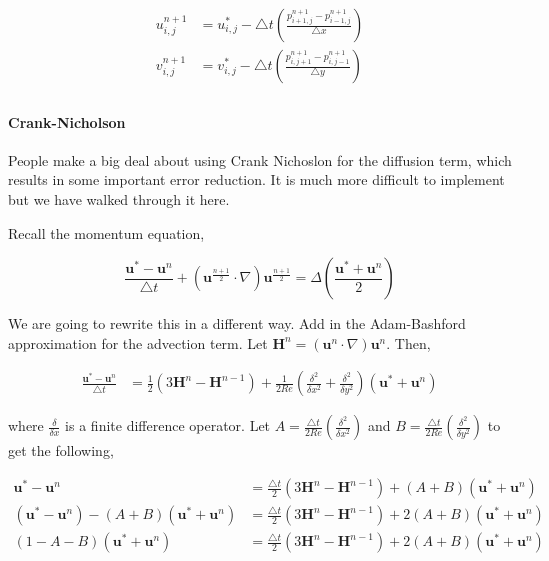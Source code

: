 \documentclass[12pt]{article}
\begin{document}
\begin{align*}
    u^{n+1}_{i,j} &= u^*_{i,j} - \bigtriangleup t (\frac{p^{n+1}_{i+1,j} - p^{n+1}_{i-1,j}}{\bigtriangleup x}) \\
    v^{n+1}_{i,j} &= v^*_{i,j} - \bigtriangleup t (\frac{p^{n+1}_{i,j+1} - p^{n+1}_{i,j-1}}{\bigtriangleup y}) \\
\end{align*}

\paragraph{Crank-Nicholson}
People make a big deal about using Crank Nichoslon for the diffusion term, which results in some important error reduction. It is much more difficult to implement but we have walked through it here.

Recall the momentum equation,

\begin{equation}
    \frac{\mathbf{u}^* - \mathbf{u}^n}{\bigtriangleup t} + (\mathbf{u}^{\frac{n+1}{2}} \cdot \nabla) \mathbf{u}^{\frac{n+1}{2}} = \Delta (\frac{\mathbf{u}^* + \mathbf{u}^n}{2})
\end{equation}

We are going to rewrite this in a different way. Add in the Adam-Bashford approximation for the advection term. Let $\mathbf{H}^n = (\mathbf{u}^{n} \cdot \nabla) \mathbf{u}^{n}$. Then,

\begin{align*}
    \frac{\mathbf{u}^* - \mathbf{u}^n}{\bigtriangleup t} &= \frac{1}{2}(3\mathbf{H}^n - \mathbf{H}^{n-1}) + \frac{1}{2Re}(\frac{\delta^2}{\delta x^2} + \frac{\delta^2}{\delta y^2})(\mathbf{u}^* + \mathbf{u}^n)
\end{align*}

where $\frac{\delta}{\delta x}$ is a finite difference operator. Let $A = \frac{\bigtriangleup t}{2 Re}(\frac{\delta^2}{\delta x^2})$ and $B = \frac{\bigtriangleup t}{2 Re}(\frac{\delta^2}{\delta y^2})$ to get the following,

\begin{align*}
\mathbf{u}^* - \mathbf{u}^n &= \frac{\bigtriangleup t}{2}(3\mathbf{H}^n - \mathbf{H}^{n-1}) + (A + B)(\mathbf{u}^* + \mathbf{u}^n) \\
(\mathbf{u}^* - \mathbf{u}^n) - (A + B)(\mathbf{u}^* + \mathbf{u}^n) &= \frac{\bigtriangleup t}{2}(3\mathbf{H}^n - \mathbf{H}^{n-1}) + 2(A + B)(\mathbf{u}^* + \mathbf{u}^n) \\
(1 - A - B)(\mathbf{u}^* + \mathbf{u}^n) &= \frac{\bigtriangleup t}{2}(3\mathbf{H}^n - \mathbf{H}^{n-1}) + 2(A + B)(\mathbf{u}^* + \mathbf{u}^n)
\end{align*}
\end{document}
